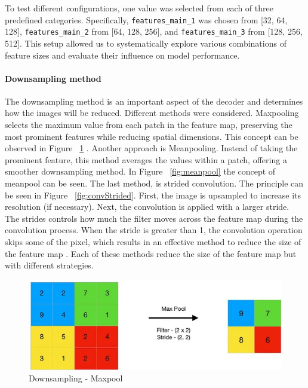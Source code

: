 \documentclass[twocolumn]{article}
\begin{document}
To test different configurations, one value was selected from each of three predefined categories.  
Specifically, \texttt{features\_main\_1} was chosen from [32, 64, 128], \texttt{features\_main\_2} from [64, 128, 256], and \texttt{features\_main\_3} from [128, 256, 512].  
This setup allowed us to systematically explore various combinations of feature sizes and evaluate their influence on model performance.

\paragraph{Downsampling method}
The downsampling method is an important aspect of the decoder and determines how the images will be reduced. Different methods were considered. 
Maxpooling selects the maximum value from each patch in the feature map, preserving the most prominent features while reducing spatial dimensions. 
This concept can be observed in Figure ~\ref{fig:maxpool} \cite{dhanushkumar-2023}.
Another approach is Meanpooling. Instead of taking the prominent feature, this method averages the values within a patch, offering a smoother downsampling method. 
In Figure ~\ref{fig:meanpool} the concept of meanpool can be seen.
The last method, is strided convolution. The principle can be seen in Figure ~\ref{fig:convStrided}. 
First, the image is upsampled to increase its resolution (if necessary). 
Next, the convolution is applied with a larger stride. 
The strides controls how much the filter moves across the feature map during the convolution process. 
When the stride is greater than 1, the convolution operation skips some of the pixel, which results in an effective method to reduce the size of the feature map \cite{unknown-author-no-date2}.
Each of these methods reduce the size of the feature map but with different strategies.


\begin{figure}
    \centering
    \includegraphics[width=1\linewidth]{Maxpool.jpg}
    \caption{Downsampling - Maxpool}
    \label{fig:maxpool}
\end{figure}
\end{document}
